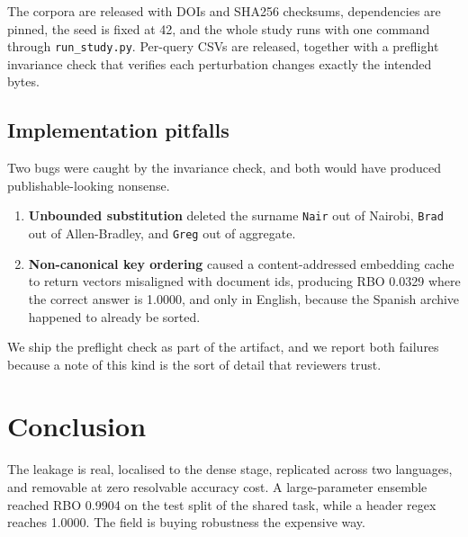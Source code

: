 \documentclass{ceurart}
\begin{document}
The corpora are released with DOIs and SHA256 checksums, dependencies are pinned, the seed
is fixed at 42, and the whole study runs with one command through \texttt{run\_study.py}.
Per-query CSVs are released, together with a preflight invariance check that verifies each
perturbation changes exactly the intended bytes.

\subsection{Implementation pitfalls}

Two bugs were caught by the invariance check, and both would have produced
publishable-looking nonsense.

\begin{enumerate}
  \item \textbf{Unbounded substitution} deleted the surname \texttt{Nair} out of Nairobi,
  \texttt{Brad} out of Allen-Bradley, and \texttt{Greg} out of aggregate.
  \item \textbf{Non-canonical key ordering} caused a content-addressed embedding cache to
  return vectors misaligned with document ids, producing RBO 0.0329 where the correct
  answer is 1.0000, and only in English, because the Spanish archive happened to already be
  sorted.
\end{enumerate}

We ship the preflight check as part of the artifact, and we report both failures because a
note of this kind is the sort of detail that reviewers trust.

\section{Conclusion}

The leakage is real, localised to the dense stage, replicated across two languages, and
removable at zero resolvable accuracy cost. A large-parameter ensemble reached RBO 0.9904
on the test split of the shared task, while a header regex reaches 1.0000. The field is buying
robustness the expensive way.


\end{document}
